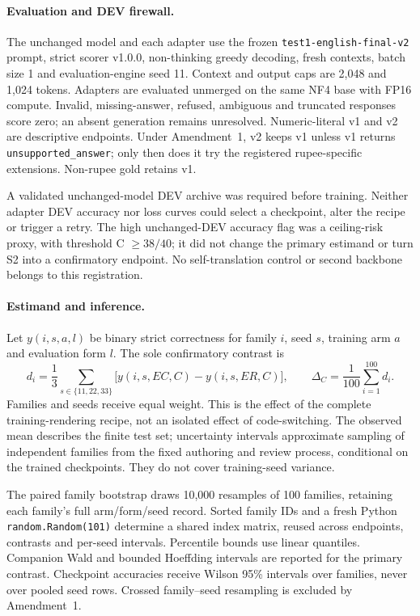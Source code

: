 \paragraph{Evaluation and DEV firewall.}
The unchanged model and each adapter use the frozen \texttt{test1-english-final-v2} prompt, strict scorer v1.0.0, non-thinking greedy decoding, fresh contexts, batch size 1 and evaluation-engine seed 11. Context and output caps are 2,048 and 1,024 tokens. Adapters are evaluated unmerged on the same NF4 base with FP16 compute. Invalid, missing-answer, refused, ambiguous and truncated responses score zero; an absent generation remains unresolved. Numeric-literal v1 and v2 are descriptive endpoints. Under Amendment~1, v2 keeps v1 unless v1 returns \texttt{unsupported\_answer}; only then does it try the registered rupee-specific extensions. Non-rupee gold retains v1.

A validated unchanged-model DEV archive was required before training. Neither adapter DEV accuracy nor loss curves could select a checkpoint, alter the recipe or trigger a retry. The high unchanged-DEV accuracy flag was a ceiling-risk proxy, with threshold C $\geq38/40$; it did not change the primary estimand or turn S2 into a confirmatory endpoint. No self-translation control or second backbone belongs to this registration.

\paragraph{Estimand and inference.}
Let $y(i,s,a,l)$ be binary strict correctness for family $i$, seed $s$, training arm $a$ and evaluation form $l$. The sole confirmatory contrast is
\[
 d_i=\frac{1}{3}\sum_{s\in\{11,22,33\}}
 \bigl[y(i,s,EC,C)-y(i,s,ER,C)\bigr],
 \qquad \Delta_C=\frac{1}{100}\sum_{i=1}^{100}d_i.
\]
Families and seeds receive equal weight. This is the effect of the complete training-rendering recipe, not an isolated effect of code-switching. The observed mean describes the finite test set; uncertainty intervals approximate sampling of independent families from the fixed authoring and review process, conditional on the trained checkpoints. They do not cover training-seed variance.

The paired family bootstrap draws 10,000 resamples of 100 families, retaining each family's full arm/form/seed record. Sorted family IDs and a fresh Python \texttt{random.Random(101)} determine a shared index matrix, reused across endpoints, contrasts and per-seed intervals. Percentile bounds use linear quantiles. Companion Wald and bounded Hoeffding intervals are reported for the primary contrast. Checkpoint accuracies receive Wilson 95\% intervals over families, never over pooled seed rows. Crossed family--seed resampling is excluded by Amendment~1.


